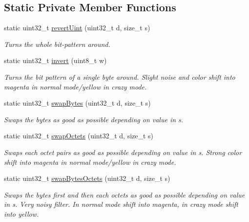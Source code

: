 \subsection*{Static Private Member Functions}
\begin{DoxyCompactItemize}
\item 
static uint32\+\_\+t \mbox{\hyperlink{classSteganoMessage_a28fdc9b9da4cbbffed718d351da65fd3}{revert\+Uint}} (uint32\+\_\+t d, size\+\_\+t s)
\begin{DoxyCompactList}\small\item\em Turns the whole bit-\/pattern around. \end{DoxyCompactList}\item 
static uint32\+\_\+t \mbox{\hyperlink{classSteganoMessage_af46fa3a09a19fc73c146e22d6a32657a}{invert}} (uint8\+\_\+t w)
\begin{DoxyCompactList}\small\item\em Turns the bit pattern of a single byte around. Slight noise and color shift into magenta in normal mode/yellow in crazy mode. \end{DoxyCompactList}\item 
static uint32\+\_\+t \mbox{\hyperlink{classSteganoMessage_af80189e6fb64aa4ae6cc48f92eaec147}{swap\+Bytes}} (uint32\+\_\+t d, size\+\_\+t s)
\begin{DoxyCompactList}\small\item\em Swaps the bytes as good as possible depending on value in s. \end{DoxyCompactList}\item 
static uint32\+\_\+t \mbox{\hyperlink{classSteganoMessage_a4751ad396485b5859b84970ddd20290d}{swap\+Octets}} (uint32\+\_\+t d, size\+\_\+t s)
\begin{DoxyCompactList}\small\item\em Swaps each octet pairs as good as possible depending on value in s. Strong color shift into magenta in normal mode/yellow in crazy mode. \end{DoxyCompactList}\item 
static uint32\+\_\+t \mbox{\hyperlink{classSteganoMessage_ad21d0b7dd149e81d9a199fb26a799da4}{swap\+Bytes\+Octets}} (uint32\+\_\+t d, size\+\_\+t s)
\begin{DoxyCompactList}\small\item\em Swaps the bytes first and then each octets as good as possible depending on value in s. Very noisy filter. In normal mode shift into magenta, in crazy mode shift into yellow. \end{DoxyCompactList}\item 

\end{DoxyCompactItemize}
